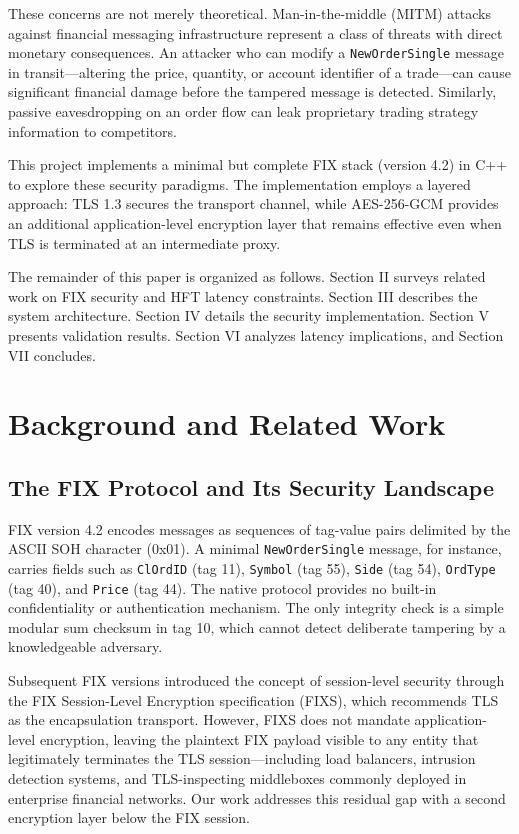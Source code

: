 \documentclass[twocolumn,10pt]{article}
\begin{document}
These concerns are not merely theoretical. Man-in-the-middle (MITM) attacks
against financial messaging infrastructure represent a class of threats with
direct monetary consequences. An attacker who can modify a \texttt{NewOrderSingle}
message in transit—altering the price, quantity, or account identifier of a
trade—can cause significant financial damage before the tampered message is
detected. Similarly, passive eavesdropping on an order flow can leak proprietary
trading strategy information to competitors.

This project implements a minimal but complete FIX stack (version 4.2) in C++
to explore these security paradigms. The implementation employs a layered
approach: TLS 1.3 \cite{rfc8446} secures the transport channel, while
AES-256-GCM \cite{nist80038d} provides an additional application-level
encryption layer that remains effective even when TLS is terminated at an
intermediate proxy.

The remainder of this paper is organized as follows. Section II surveys
related work on FIX security and HFT latency constraints. Section III
describes the system architecture. Section IV details the security
implementation. Section V presents validation results. Section VI analyzes
latency implications, and Section VII concludes.

\section{Background and Related Work}

\subsection{The FIX Protocol and Its Security Landscape}

FIX version 4.2 \cite{fix42} encodes messages as sequences of tag-value pairs
delimited by the ASCII SOH character (0x01). A minimal \texttt{NewOrderSingle}
message, for instance, carries fields such as \texttt{ClOrdID} (tag 11),
\texttt{Symbol} (tag 55), \texttt{Side} (tag 54), \texttt{OrdType} (tag 40),
and \texttt{Price} (tag 44). The native protocol provides no built-in
confidentiality or authentication mechanism. The only integrity check is a
simple modular sum checksum in tag 10, which cannot detect deliberate
tampering by a knowledgeable adversary.

Subsequent FIX versions introduced the concept of session-level security
through the FIX Session-Level Encryption specification (FIXS), which
recommends TLS as the encapsulation transport. However, FIXS does not mandate
application-level encryption, leaving the plaintext FIX payload visible to
any entity that legitimately terminates the TLS session—including load
balancers, intrusion detection systems, and TLS-inspecting middleboxes
commonly deployed in enterprise financial networks. Our work addresses this
residual gap with a second encryption layer below the FIX session.
\end{document}
